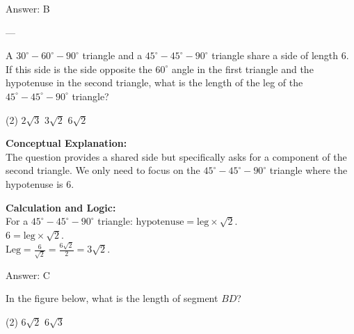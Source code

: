 \documentclass[11pt,paper=a4,answers]{exam}
\begin{document}
\begin{questions}
\begin{solution}
\vspace{15pt}
Answer: \colorbox{yellow!100}{B}
\end{solution}

---

\question
A $30^\circ-60^\circ-90^\circ$ triangle and a $45^\circ-45^\circ-90^\circ$ triangle share a side of length 6. If this side is the side opposite the $60^\circ$ angle in the first triangle and the hypotenuse in the second triangle, what is the length of the leg of the $45^\circ-45^\circ-90^\circ$ triangle?
\begin{tasks}(2)
    \task $2\sqrt{3}$
    \task $3\sqrt{2}$
    \task $6\sqrt{2}$
\end{tasks}

\begin{solution}
\textbf{Conceptual Explanation:} \\
The question provides a shared side but specifically asks for a component of the second triangle. We only need to focus on the $45^\circ-45^\circ-90^\circ$ triangle where the hypotenuse is 6.

\vspace{10pt}
\textbf{Calculation and Logic:} \\
For a $45^\circ-45^\circ-90^\circ$ triangle: $\text{hypotenuse} = \text{leg} \times \sqrt{2}$. \\
$6 = \text{leg} \times \sqrt{2}$. \\
$\text{Leg} = \frac{6}{\sqrt{2}} = \frac{6\sqrt{2}}{2} = 3\sqrt{2}$.

\vspace{15pt}
Answer: \colorbox{yellow!100}{C}
\end{solution}



\question
In the figure below, what is the length of segment $BD$?
\begin{center}
\end{center}
\begin{tasks}(2)
    \task $6\sqrt{2}$
    \task $6\sqrt{3}$
\end{tasks}


\end{questions}
\end{document}
